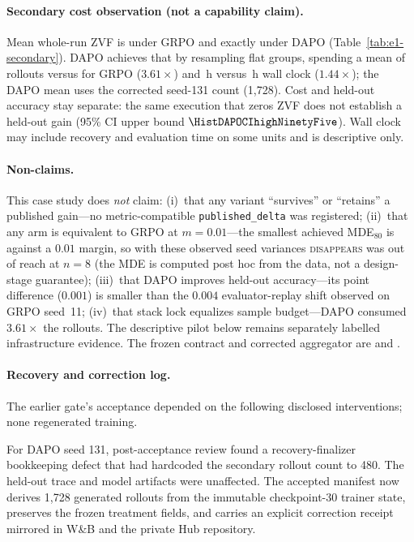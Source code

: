 \documentclass[11pt]{article}
\newcommand{\zvf}{\textnormal{ZVF}}
\newcommand{\verdict}[1]{\textsc{#1}}
\begin{document}
\paragraph{Secondary cost observation (not a capability claim).} Mean
whole-run \zvf{} is \HistGRPOZvf{} under GRPO and exactly \HistDAPOZvf{} under
DAPO (Table~\ref{tab:e1-secondary}). DAPO achieves that by resampling flat
groups, spending a mean of \HistDAPORollouts{} rollouts versus
\HistGRPORollouts{} for GRPO ($3.61\times$) and \HistDAPOHours{}\,h versus
\HistGRPOHours{}\,h wall clock ($1.44\times$); the DAPO mean uses the corrected
seed-131 count (1,728). Cost and held-out accuracy stay separate: the same
execution that zeros \zvf{} does not establish a held-out gain (95\% CI upper
bound $\HistDAPOCIhighNinetyFive$). Wall clock may include recovery and evaluation
time on some units and is descriptive only.

\paragraph{Non-claims.} This case study does \emph{not} claim: (i)~that any
variant ``survives'' or ``retains'' a published gain---no metric-compatible
\texttt{published\_delta} was registered; (ii)~that any arm is equivalent to
GRPO at $m=0.01$---the smallest achieved MDE$_{80}$ is \HistDAPOMDE{} against a
$0.01$ margin, so with these observed seed variances \verdict{disappears} was
out of reach at $n{=}8$ (the MDE is computed post hoc from the data, not a
design-stage guarantee); (iii)~that DAPO improves held-out accuracy---its point
difference ($0.001$) is smaller than the $0.004$ evaluator-replay shift
observed on GRPO seed~11; (iv)~that stack lock equalizes sample budget---DAPO
consumed $3.61\times$ the rollouts. The descriptive pilot below remains
separately labelled infrastructure evidence. The frozen contract and corrected
aggregator are  and
.

\paragraph{Recovery and correction log.} The earlier gate's acceptance
depended on the following disclosed interventions; none regenerated training.

For DAPO seed 131, post-acceptance review found a recovery-finalizer
bookkeeping defect that had hardcoded the secondary rollout count to 480. The
held-out trace and model artifacts were unaffected. The accepted manifest now
derives 1,728 generated rollouts from the immutable checkpoint-30 trainer state,
preserves the frozen treatment fields, and carries an explicit correction
receipt mirrored in W\&B and the private Hub repository.
\end{document}
